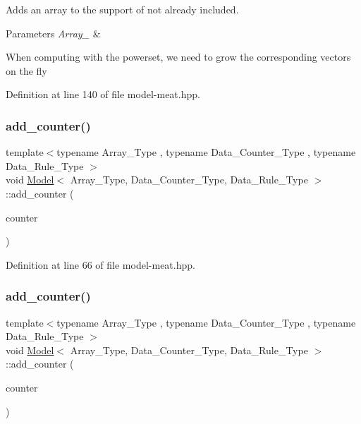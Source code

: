 Adds an array to the support of not already included. 


\begin{DoxyParams}{Parameters}
{\em Array\+\_\+} & \\
\hline
\end{DoxyParams}
When computing with the powerset, we need to grow the corresponding vectors on the fly 

Definition at line 140 of file model-\/meat.\+hpp.

\mbox{\label{class_model_a1548bd4681944c3eb761a22a38ef5547}} 
\subsubsection{\texorpdfstring{add\+\_\+counter()}{add\_counter()}\hspace{0.1cm}{\footnotesize\ttfamily [1/3]}}
{\footnotesize\ttfamily template$<$typename Array\+\_\+\+Type , typename Data\+\_\+\+Counter\+\_\+\+Type , typename Data\+\_\+\+Rule\+\_\+\+Type $>$ \\
void \hyperlink{class_model}{Model}$<$ Array\+\_\+\+Type, Data\+\_\+\+Counter\+\_\+\+Type, Data\+\_\+\+Rule\+\_\+\+Type $>$\+::add\+\_\+counter (\begin{DoxyParamCaption}\item[{\hyperlink{class_counter}{Counter}$<$ Array\+\_\+\+Type, Data\+\_\+\+Counter\+\_\+\+Type $>$ \&}]{counter }\end{DoxyParamCaption})\hspace{0.3cm}{\ttfamily [inline]}}



Definition at line 66 of file model-\/meat.\+hpp.

\mbox{\label{class_model_a6c1f524daf08e10888a49318030616c4}} 
\subsubsection{\texorpdfstring{add\+\_\+counter()}{add\_counter()}\hspace{0.1cm}{\footnotesize\ttfamily [2/3]}}
{\footnotesize\ttfamily template$<$typename Array\+\_\+\+Type , typename Data\+\_\+\+Counter\+\_\+\+Type , typename Data\+\_\+\+Rule\+\_\+\+Type $>$ \\
void \hyperlink{class_model}{Model}$<$ Array\+\_\+\+Type, Data\+\_\+\+Counter\+\_\+\+Type, Data\+\_\+\+Rule\+\_\+\+Type $>$\+::add\+\_\+counter (\begin{DoxyParamCaption}\item[{\hyperlink{class_counter}{Counter}$<$ Array\+\_\+\+Type, Data\+\_\+\+Counter\+\_\+\+Type $>$ $\ast$}]{counter }\end{DoxyParamCaption})\hspace{0.3cm}{\ttfamily [inline]}}




